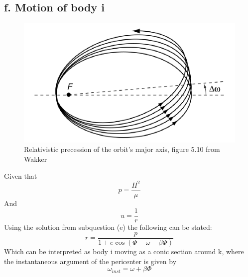 \subsection{f. Motion of body i}
\begin{figure}[h]
\centering
\includegraphics[scale=1]{chapters/Capture.png}
\caption{Relativistic precession of the orbit's major axis, figure 5.10 from Wakker}
\end{figure}
Given that
\begin{equation}
p = \frac{H^2}{\mu}
\end{equation}
And
\begin{equation}
u = \frac{1}{r}
\end{equation}
Using the solution from subquestion (e) the following can be stated:
\begin{equation}
r = \frac{p}{1+e\cos(\Phi - \omega - \beta \Phi)}
\end{equation}
Which can be interpreted as body i moving as a conic section around k, where the instantaneous argument of the pericenter is given by
\begin{equation}
\omega_{inst} = \omega + \beta \Phi
\end{equation}
